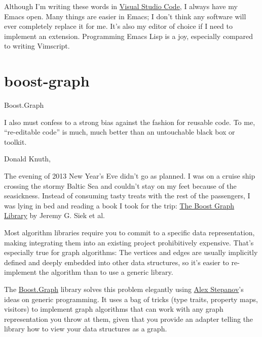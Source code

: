 \documentclass{article}
\begin{document}
Although I'm writing these words in \href{https://code.visualstudio.com/}{Visual Studio Code}, I always have my Emacs open.
Many things are easier in Emacs; I don't think any software will ever completely replace it for me.
It's also my editor of choice if I need to implement an extension.
Programming Emacs Lisp is a joy, especially compared to writing Vimscript.

\section{boost-graph}{Boost.Graph}

\epigraph{
  I also must confess to a strong bias against the fashion for reusable code.
  To me, ``re-editable code'' is much, much better than an untouchable black box or toolkit.
}{
  Donald Knuth, \href{https://www.informit.com/articles/article.aspx?p=1193856}{\cite{Interview with Andrew Binstock}}
}

The evening of 2013 New Year's Eve didn't go as planned.
I was on a cruise ship crossing the stormy Baltic Sea and couldn't stay on my feet because of the seasickness.
Instead of consuming tasty treats with the rest of the passengers, I was lying in bed and reading a book I took for the trip: \href{https://www.goodreads.com/book/show/1705806.The_Boost_Graph_Library}{The Boost Graph Library} by Jeremy G. Siek et al.

Most algorithm libraries require you to commit to a specific data representation, making integrating them into an existing project prohibitively expensive.
That's especially true for graph algorithms: The vertices and edges are usually implicitly defined and deeply embedded into other data structures, so it's easier to re-implement the algorithm than to use a generic library.

The \href{https://www.boost.org/library/latest/graph/}{Boost.Graph} library solves this problem elegantly using \href{https://en.wikipedia.org/wiki/Alexander_Stepanov}{Alex Stepanov}'s ideas on generic programming.
It uses a bag of tricks (type traits, property maps, visitors) to implement graph algorithms that can work with any graph representation you throw at them, given that you provide an adapter telling the library how to view your data structures as a graph.
\end{document}
